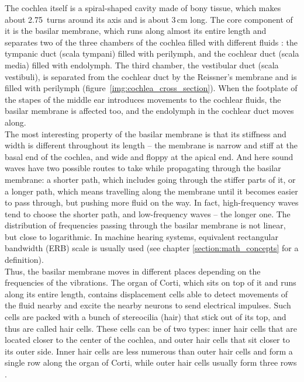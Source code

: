The cochlea itself is a spiral-shaped cavity made of bony tissue, which makes about 2.75~turns around its axis and is about 3\,cm long. The core component of it is the basilar membrane, which runs along almost its entire length and separates two of the three chambers of the cochlea filled with different fluids \cite{Schnupp2011}: the tympanic duct (scala tympani) filled with perilymph, and the cochlear duct (scala media) filled with endolymph. The third chamber, the vestibular duct (scala vestibuli), is separated from the cochlear duct by the Reissner’s membrane and is filled with perilymph (figure~\ref{img:cochlea_cross_section}). When the footplate of the stapes of the middle ear introduces movements to the cochlear fluids, the basilar membrane is affected too, and the endolymph in the cochlear duct moves along.\\

The most interesting property of the basilar membrane is that its stiffness and width is different throughout its length – the membrane is narrow and stiff at the basal end of the cochlea, and wide and floppy at the apical end. And here sound waves have two possible routes to take while propagating through the basilar membrane: a shorter path, which includes going through the stiffer parts of it, or a longer path, which means travelling along the membrane until it becomes easier to pass through, but pushing more fluid on the way. In fact, high-frequency waves tend to choose the shorter path, and low-frequency waves – the longer one. The distribution of frequencies passing through the basilar membrane is not linear, but close to logarithmic. In machine hearing systems, equivalent rectangular bandwidth (ERB) scale is usually used (see chapter \ref{section:math_concepts} for a definition).\\

Thus, the basilar membrane moves in different places depending on the frequencies of the vibrations. The organ of Corti, which sits on top of it and runs along its entire length, contains displacement cells able to detect movements of the fluid nearby and excite the nearby neurons to send electrical impulses. Such cells are packed with a bunch of stereocilia (hair) that stick out of its top, and thus are called hair cells. These cells can be of two types: inner hair cells that are located closer to the center of the cochlea, and outer hair cells that sit closer to its outer side. Inner hair cells are less numerous than outer hair cells and form a single row along the organ of Corti, while outer hair cells usually form three rows \cite{Schnupp2011}.\\


